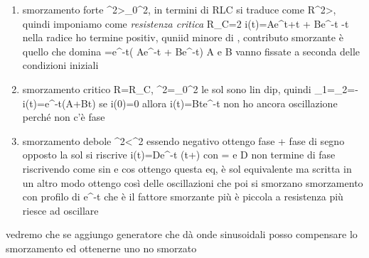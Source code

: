 \begin{enumerate}
	\item smorzamento forte \gamma^2>\omega_0^2, in termini di RLC si traduce come R^2>, quindi imponiamo come \textit{resistenza critica} R_C=2
	i(t)=Ae^{\gamma t+t} + Be^{-\gamma t -t\sqrt{}}
	nella radice ho termine positiv, quniid minore di \gamma, contributo smorzante è quello che domina
	=e^{-\gamma t}\left( Ae^{-t} + Be^{-t}\right)
	A e B vanno fissate a seconda delle condizioni iniziali
	\item smorzamento critico R=R_C, \gamma^2=\omega_0^2
	le sol sono lin dip, quindi \alpha_1=\alpha_2=-\gamma
	i(t)=e^{-\gamma t}(A+Bt)
	se i(0)=0 allora i(t)=Bte^{-\gamma t}
	non ho ancora oscillazione perché non c'è fase
	\item smorzamento debole \gamma^2<\omega^2	essendo negativo ottengo fase + fase di segno opposto
	la sol si riscrive i(t)=De^{-\gamma t} \sin(\omega t+\oldphi)
	con \omega= e D non termine di fase
	riscrivendo come sin e cos ottengo questa eq, è sol equivalente ma scritta in un altro modo
	ottengo così delle oscillazioni che poi si smorzano
	smorzamento con profilo di e^{-\gamma t} che è il fattore smorzante
	più è piccola a resistenza più riesce ad oscillare
	



\end{enumerate}


vedremo che se aggiungo generatore che dà onde sinusoidali posso compensare lo smorzamento ed ottenerne uno no smorzato


